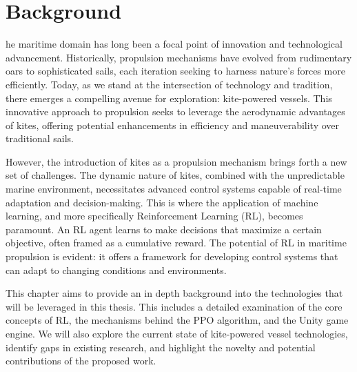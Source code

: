 %

%
\let\textcircled=\pgftextcircled
\chapter{Background}\label{chap:background}





he maritime domain has long been a focal point of innovation and technological advancement. Historically, propulsion mechanisms have evolved from rudimentary oars to sophisticated sails, each iteration seeking to harness nature's forces more efficiently. Today, as we stand at the intersection of technology and tradition, there emerges a compelling avenue for exploration: kite-powered vessels. This innovative approach to propulsion seeks to leverage the aerodynamic advantages of kites, offering potential enhancements in efficiency and maneuverability over traditional sails.

However, the introduction of kites as a propulsion mechanism brings forth a new set of challenges. The dynamic nature of kites, combined with the unpredictable marine environment, necessitates advanced control systems capable of real-time adaptation and decision-making. This is where the application of machine learning, and more specifically Reinforcement Learning (RL), becomes paramount. An RL agent learns to make decisions that maximize a certain objective, often framed as a cumulative reward. The potential of RL in maritime propulsion is evident: it offers a framework for developing control systems that can adapt to changing conditions and environments.

This chapter aims to provide an in depth background into the technologies that will be leveraged in this thesis. This includes a detailed examination of the core concepts of RL, the mechanisms behind the PPO algorithm, and the Unity game engine. We will also explore the current state of kite-powered vessel technologies, identify gaps in existing research, and highlight the novelty and potential contributions of the proposed work.

